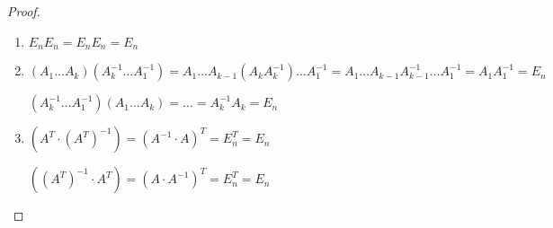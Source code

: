 \begin{proof}
    \begin{enumerate}
        \item $E_n E_n = E_n E_n = E_n$
        
        \item $(A_1 \ldots A_k)(A_k^{-1} \ldots A_1^{-1}) = A_1 \ldots A_{k-1} (A_k A_k^{-1}) \ldots A_1^{-1} = A_1 \ldots A_{k - 1} A_{k - 1}^{-1} \ldots A_1^{-1} = A_1 A_1^{-1} = E_n$
        
        $(A_k^{-1} \ldots A_1^{-1})(A_1 \ldots A_k) = \ldots = A_k^{-1} A_k = E_n$

        \item $(A^T \cdot (A^T)^{-1}) = (A^{-1} \cdot A)^T = E_n^T = E_n$
        
        $((A^T)^{-1} \cdot A^T) = (A \cdot A^{-1})^T = E_n^T = E_n$
    \end{enumerate}
\end{proof}